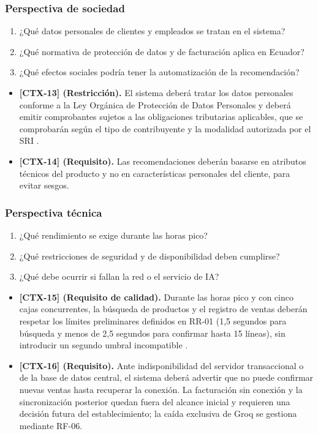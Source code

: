 \documentclass[onecolumn,12pt,a4paper]{IEEEtran}
\begin{document}
\subsubsection{Perspectiva de sociedad}
\begin{enumerate}
  \item ¿Qu\'e datos personales de clientes y empleados se tratan en el sistema?
  \item ¿Qu\'e normativa de protecci\'on de datos y de facturaci\'on aplica en Ecuador?
  \item ¿Qu\'e efectos sociales podr\'ia tener la automatizaci\'on de la recomendaci\'on?
\end{enumerate}
\begin{itemize}
  \item \textbf{[CTX-13] (Restricci\'on).} El sistema deber\'a tratar los datos personales conforme a la Ley Org\'anica de Protecci\'on de Datos Personales y deber\'a emitir comprobantes sujetos a las obligaciones tributarias aplicables, que se comprobar\'an seg\'un el tipo de contribuyente y la modalidad autorizada por el SRI \cite{ecuador_lopdp2021,sri_comprobantes}.
  \item \textbf{[CTX-14] (Requisito).} Las recomendaciones deber\'an basarse en atributos t\'ecnicos del producto y no en caracter\'isticas personales del cliente, para evitar sesgos.
\end{itemize}

\subsubsection{Perspectiva t\'ecnica}
\begin{enumerate}
  \item ¿Qu\'e rendimiento se exige durante las horas pico?
  \item ¿Qu\'e restricciones de seguridad y de disponibilidad deben cumplirse?
  \item ¿Qu\'e debe ocurrir si fallan la red o el servicio de IA?
\end{enumerate}
\begin{itemize}
  \item \textbf{[CTX-15] (Requisito de calidad).} Durante las horas pico y con cinco cajas concurrentes, la b\'usqueda de productos y el registro de ventas deber\'an respetar los l\'imites preliminares definidos en RR-01 (1,5 segundos para b\'usqueda y menos de 2,5 segundos para confirmar hasta 15 l\'ineas), sin introducir un segundo umbral incompatible \cite{iso25010}.
  \item \textbf{[CTX-16] (Requisito).} Ante indisponibilidad del servidor transaccional o de la base de datos central, el sistema deber\'a advertir que no puede confirmar nuevas ventas hasta recuperar la conexi\'on. La facturaci\'on sin conexi\'on y la sincronizaci\'on posterior quedan fuera del alcance inicial y requieren una decisi\'on futura del establecimiento; la ca\'ida exclusiva de Groq se gestiona mediante RF-06.
\end{itemize}
\end{document}

